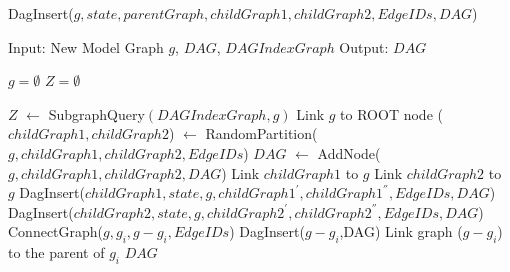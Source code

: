 

\begin{algorithm}
\caption{DagInsert($g,state, parentGraph,childGraph1,childGraph2,EdgeIDs,DAG$)} 
\label{alg:alg102}
\begin{algorithmic}
\STATE Input: New Model Graph $g$, $DAG$, $DAGIndexGraph$
\STATE Output: $DAG$ 
\end{algorithmic}
\begin{algorithmic}[1]
\STATE $g = \emptyset$
\STATE $Z= \emptyset$

\STATE $Z$ $\leftarrow$  SubgraphQuery$(DAGIndexGraph, g)$
\ENDFOR 
{}
    \STATE Link $g$ to ROOT node
        \STATE ($childGraph1,childGraph2$) $\leftarrow$ RandomPartition($g,childGraph1,childGraph2,EdgeIDs$)
        \STATE $DAG$ $\leftarrow$ AddNode($g, childGraph1, childGraph2, DAG$)
        \STATE Link $childGraph1$ to $g$ 
        \STATE Link $childGraph2$ to $g$ 
        \STATE DagInsert($childGraph1,state, g ,childGraph1^{'} ,childGraph1^{''}, EdgeIDs,DAG$)
        \STATE DagInsert($childGraph2,state, g ,childGraph2^{'} ,childGraph2^{''}, EdgeIDs,DAG$)
     \ENDWHILE
{}
\RETURN
\ELSE 
       \STATE ConnectGraph($g,g_i,g-g_i,EdgeIDs$)
       \STATE DagInsert($g-g_i$,DAG)
       \STATE Link graph ($g-g_i$) to the parent of $g_i$ 
    \ENDFOR
\ENDIF
\RETURN $DAG$
\end{algorithmic}
\end{algorithm}



